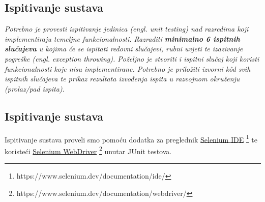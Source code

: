 \pagebreak

\subsection{Ispitivanje sustava}
\textit{Potrebno je provesti ispitivanje jedinica (engl. unit testing) nad razredima koji implementiraju temeljne funkcionalnosti. Razraditi \textbf{minimalno 6 ispitnih slučajeva} u kojima će se ispitati redovni slučajevi, rubni uvjeti te izazivanje pogreške (engl. exception throwing). Poželjno je stvoriti i ispitni slučaj koji koristi funkcionalnosti koje nisu implementirane. Potrebno je priložiti izvorni kôd svih ispitnih slučajeva te prikaz rezultata izvođenja ispita u razvojnom okruženju (prolaz/pad ispita). }

\subsection{Ispitivanje sustava}

Ispitivanje sustava proveli smo pomoću dodatka za preglednik
\underline{Selenium IDE} \footnote{https://www.selenium.dev/documentation/ide/}
te koristeći \underline{Selenium WebDriver}
\footnote{https://www.selenium.dev/documentation/webdriver/} unutar JUnit
testova.

